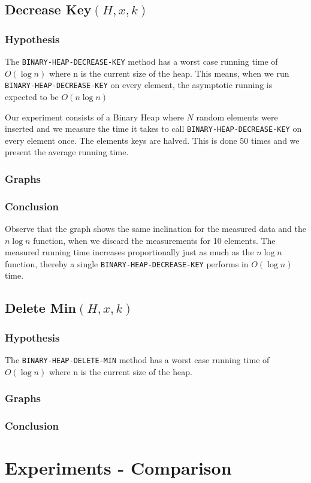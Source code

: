 \documentclass[a4paper,oneside,11pt]{article}
\begin{document}
\subsection*{Decrease Key$(H,x,k)$}

\subsubsection*{Hypothesis}
The \texttt{BINARY-HEAP-DECREASE-KEY} method has a worst case running time of $O(\log n)$ where n is the current size of the heap. This means, when we run \texttt{BINARY-HEAP-DECREASE-KEY} on every element, the asymptotic running is expected to be $O(n\log n)$ 

Our experiment consists of a Binary Heap where $N$ random elements were inserted and we measure the time it takes to call \texttt{BINARY-HEAP-DECREASE-KEY} on every element once. The elements keys are halved. This is done 50 times and we present the average running time.
\subsubsection*{Graphs}

\subsubsection*{Conclusion}
Observe that the graph shows the same inclination for the measured data and the $n\log n$ function, when we discard the measurements for 10 elements. The measured running time increases proportionally just as much as the $n\log n$ function, thereby a single \texttt{BINARY-HEAP-DECREASE-KEY} performs in $O(\log n)$ time.

\subsection*{Delete Min$(H,x,k)$}

\subsubsection*{Hypothesis}
The \texttt{BINARY-HEAP-DELETE-MIN} method has a worst case running time of $O(\log n)$ where n is the current size of the heap.
\subsubsection*{Graphs}

\subsubsection*{Conclusion}

\section*{Experiments - Comparison}
\end{document}
